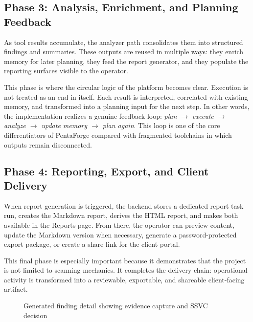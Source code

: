 \documentclass[12pt,a4paper]{report}
\begin{document}
\subsection{Phase 3: Analysis, Enrichment, and Planning Feedback}

As tool results accumulate, the analyzer path consolidates them into structured
findings and summaries. These outputs are reused in multiple ways: they enrich memory
for later planning, they feed the report generator, and they populate the reporting
surfaces visible to the operator.

This phase is where the circular logic of the platform becomes clear. Execution is
not treated as an end in itself. Each result is interpreted, correlated with
existing memory, and transformed into a planning input for the next step. In other
words, the implementation realizes a genuine feedback loop:
\emph{plan $\rightarrow$ execute $\rightarrow$ analyze $\rightarrow$ update memory
$\rightarrow$ plan again}. This loop is one of the core differentiators of
PentaForge compared with fragmented toolchains in which outputs remain disconnected.

\subsection{Phase 4: Reporting, Export, and Client Delivery}

When report generation is triggered, the backend stores a dedicated report task run,
creates the Markdown report, derives the HTML report, and makes both available in the
Reports page. From there, the operator can preview content, update the Markdown
version when necessary, generate a password-protected export package, or create a
share link for the client portal.

This final phase is especially important because it demonstrates that the project is
not limited to scanning mechanics. It completes the delivery chain: operational
activity is transformed into a reviewable, exportable, and shareable client-facing
artifact.

\begin{figure}[H]
    \centering
    \caption{Generated finding detail showing evidence capture and SSVC decision}
    \label{fig:ui_report}
\end{figure}
\end{document}
